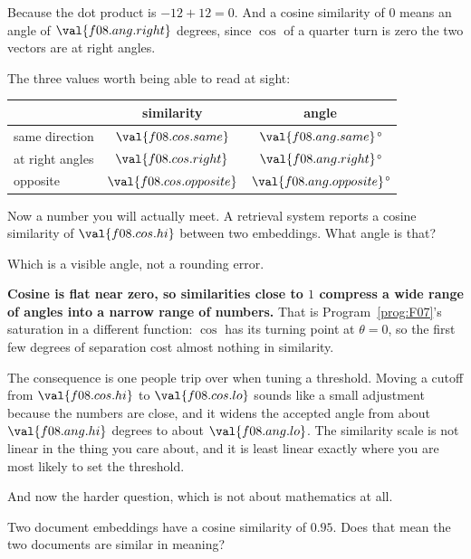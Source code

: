 \begin{fr}
Because the dot product is $-12 + 12 = 0$. And a cosine similarity of $0$ means
an angle of $\val{f08.ang.right}$ degrees, since $\cos$ of a quarter turn is
zero \dash{} the two vectors are at right angles.

The three values worth being able to read at sight:

\begin{center}
\begin{tabular}{lcc}
\toprule
& similarity & angle \\
\midrule
same direction & $\val{f08.cos.same}$ & $\val{f08.ang.same}$° \\
at right angles & $\val{f08.cos.right}$ & $\val{f08.ang.right}$° \\
opposite & $\val{f08.cos.opposite}$ & $\val{f08.ang.opposite}$° \\
\bottomrule
\end{tabular}
\end{center}

Now a number you will actually meet. A retrieval system reports a cosine
similarity of $\val{f08.cos.hi}$ between two embeddings. What angle is that?
\nextframe
\end{fr}

\begin{fr}
Which is a visible angle, not a rounding error.

\begin{trapbox}
\textbf{Cosine is flat near zero, so similarities close to $1$ compress a wide
range of angles into a narrow range of numbers.} That is
Program~\ref{prog:F07}'s saturation in a different function: $\cos$ has its
turning point at $\theta = 0$, so the first few degrees of separation cost
almost nothing in similarity.

The consequence is one people trip over when tuning a threshold. Moving a
cutoff from $\val{f08.cos.hi}$ to $\val{f08.cos.lo}$ sounds like a small
adjustment because the numbers are close, and it widens the accepted angle
from about $\val{f08.ang.hi}$ degrees to about $\val{f08.ang.lo}$. The
similarity scale is not linear in the thing you care about, and it is least
linear exactly where you are most likely to set the threshold.
\end{trapbox}
\end{fr}

\begin{fr}
And now the harder question, which is not about mathematics at all.

Two document embeddings have a cosine similarity of $\num{0.95}$. Does that
mean the two documents are similar in meaning?
\dotline
\nextframe
\end{fr}

